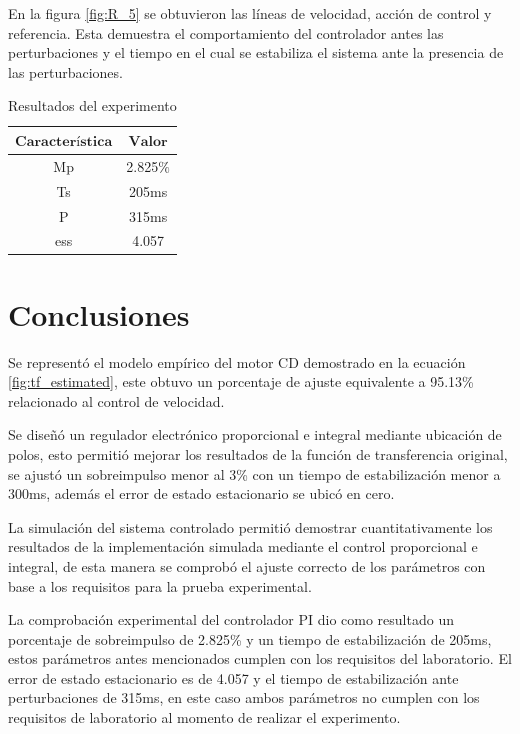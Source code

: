 \documentclass[conference]{IEEEtran}
\begin{document}
En la figura \ref{fig:R_5} se obtuvieron las líneas de velocidad, acción de control y referencia. Esta demuestra el comportamiento del controlador antes las perturbaciones y el tiempo en el cual se estabiliza el sistema ante la presencia de las perturbaciones.

\begin{table}[]
    \centering
    \begin{tabular}{|c|c|}
    \hline
    $\textbf{Característica}$ & $\textbf{Valor}$ \\
    \hline
    Mp & 2.825$\%$ \\
    Ts & 205ms \\
    P & 315ms \\
    ess & 4.057 \\
    \hline
    \end{tabular}
    \caption{Resultados del experimento}
    \label{tab:tablaf}
\end{table}





\section{Conclusiones}
Se representó el modelo empírico del motor CD demostrado en la ecuación \ref{fig:tf_estimated}, este obtuvo un porcentaje de ajuste equivalente a 95.13\% relacionado al control de velocidad.


Se diseñó un regulador electrónico proporcional e integral mediante ubicación de polos, esto permitió mejorar los resultados de la función de transferencia original, se ajustó un sobreimpulso menor al 3\% con un tiempo de estabilización menor a 300ms, además el error de estado estacionario se ubicó en cero.

La simulación del sistema controlado permitió demostrar cuantitativamente los resultados de la implementación simulada mediante el control proporcional e integral, de esta manera se comprobó el ajuste correcto de los parámetros con base a los requisitos para la prueba experimental.

La comprobación experimental del controlador PI dio como resultado un porcentaje de sobreimpulso de 2.825\% y un tiempo de estabilización de 205ms, estos parámetros antes mencionados cumplen con los requisitos del laboratorio. El error de estado estacionario es de 4.057 y el tiempo de estabilización ante perturbaciones de 315ms, en este caso ambos parámetros no cumplen con los requisitos de laboratorio al momento de realizar el experimento.

%
%


\end{document}
